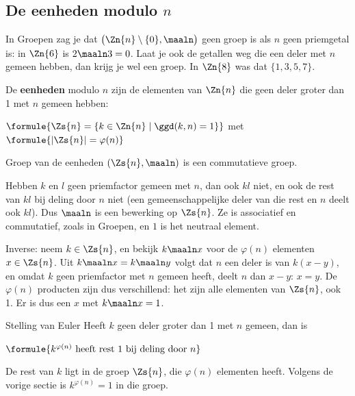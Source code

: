 \begin{oefeningen}
\end{oefeningen}

\subsection{De eenheden modulo \texorpdfstring{$n$}{n}}

In Groepen zag je dat $\bigl(\Zn{n} \setminus \{0\}, \maaln\bigr)$ geen groep is als $n$ geen priemgetal is: in $\Zn{6}$ is $2 \maaln 3 = 0$. Laat je ook de getallen weg die een deler met $n$ gemeen hebben, dan krijg je wel een groep. In $\Zn{8}$ was dat $\{1, 3, 5, 7\}$.

\begin{theorie}
De \textbf{\textcolor{accent}{eenheden}} modulo $n$ zijn de elementen van $\Zn{n}$ die geen deler groter dan 1 met $n$ gemeen hebben:

\vspace{1mm}
\qquad $\formule{\Zs{n} = \{k \in \Zn{n} \mid \ggd(k, n) = 1\}}$ \qquad met \quad $\formule{|\Zs{n}| = \varphi(n)}$

\begin{stelling}{Groep van de eenheden}
$(\Zs{n}, \maaln)$ is een commutatieve groep.
\end{stelling}

\begin{bewijs}
Hebben $k$ en $l$ geen priemfactor gemeen met $n$, dan ook $kl$ niet, en ook de rest van $kl$ bij deling door $n$ niet (een gemeenschappelijke deler van die rest en $n$ deelt ook $kl$). Dus $\maaln$ is een bewerking op $\Zs{n}$. Ze is associatief en commutatief, zoals in Groepen, en $1$ is het neutraal element.

Inverse: neem $k \in \Zs{n}$, en bekijk $k \maaln x$ voor de $\varphi(n)$ elementen $x \in \Zs{n}$. Uit $k \maaln x = k \maaln y$ volgt dat $n$ een deler is van $k(x - y)$, en omdat $k$ geen priemfactor met $n$ gemeen heeft, deelt $n$ dan $x - y$: $x = y$. De $\varphi(n)$ producten zijn dus verschillend: het zijn alle elementen van $\Zs{n}$, ook 1. Er is dus een $x$ met $k \maaln x = 1$.
\end{bewijs}
\end{theorie}

\begin{theorie}
\begin{stelling}{Stelling van Euler}
Heeft $k$ geen deler groter dan 1 met $n$ gemeen, dan is

\vspace{1mm}
\qquad $\formule{k^{\varphi(n)} \text{ heeft rest } 1 \text{ bij deling door } n}$
\end{stelling}

\begin{bewijs}
De rest van $k$ ligt in de groep $\Zs{n}$, die $\varphi(n)$ elementen heeft. Volgens de vorige sectie is $k^{\varphi(n)} = 1$ in die groep.
\end{bewijs}
\end{theorie}

